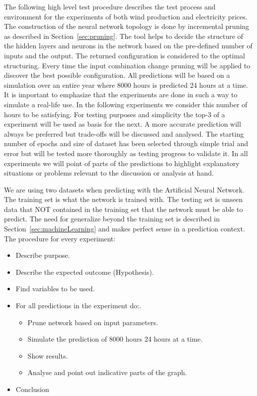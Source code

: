 The following high level test procedure describes the test process and environment for the experiments of both wind production and electricity prices. 
\\[0.5cm]
The construction of the neural network topology is done by incremental pruning as described in Section~\ref{sec:pruning}. The tool helps to decide the structure of the hidden layers and neurons in the network based on the pre-defined number of inputs and the output. The returned configuration is considered to the optimal structuring. Every time the input combination change pruning will be applied to discover the best possible configuration. All predictions will be based on a simulation over an entire year where 8000 hours is predicted 24 hours at a time. It is important to emphasize that the experiments are done in such a way to simulate a real-life use. In the following experiments we consider this number of hours to be satisfying.  For testing purposes and simplicity the top-3 of a experiment will be used as basis for the next. A more accurate prediction will always be preferred but trade-offs will be discussed and analysed. The starting number of epochs and size of dataset has been selected through simple trial and error but will be tested more thoroughly as testing progress to validate it. In all experiments we will point of parts of the predictions to highlight explanatory situations or problems relevant to the discussion or analysis at hand.     

We are using two datasets when predicting with the Artificial Neural Network. The training set is what the network is trained with. The testing set is unseen data that NOT contained in the training set that the network must be able to predict. The need for generalize beyond the training set is described in Section~\ref{sec:machineLearning} and makes perfect sense in a prediction context.
\\[0.5cm]
The procedure for every experiment:
\begin{itemize}
\item Describe purpose.
\item Describe the expected outcome (Hypothesis).
\item Find variables to be used.
\item For all predictions in the experiment do:.
\begin{itemize}
	\item Prune network based on input parameters.
	\item Simulate the prediction of 8000 hours 24 hours at a time.
	\item Show results.
	\item Analyse and point out indicative parts of the graph.
\end{itemize}
\item Conclusion

\end{itemize}